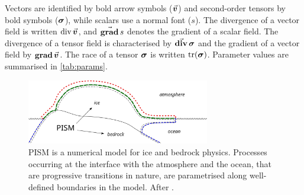 \documentclass[a4paper]{kappa}
\newcommand{\vect}[1]{\va*{#1}} %
\newcommand{\tens}[1]{\vb*{#1}} %
\renewcommand{\div}[1]{\mathrm{div}\,#1}            %
\renewcommand{\grad}[1]{\vect{\mathrm{grad}}\,#1}   %
\newcommand{\tdiv}[1]{\vect{\mathrm{div}}\,#1}      %
\newcommand{\tgrad}[1]{\tens{\mathrm{grad}}\,#1}    %
\newcommand{\CST}[0]{\tens{\sigma}}     %
\newcommand{\vv}[0]{\vect{v}}           %
\begin{document}
Vectors are identified by bold arrow symbols ($\vv$) and second-order tensors by bold symbols ($\CST$), while scalars use a normal font ($s$). The divergence of a vector field is written $\div{\vv}$, and $\grad{s}$ denotes the gradient of a scalar field. The divergence of a tensor field is characterised by $\tdiv{\CST}$ and the gradient of a vector field by $\tgrad{\vv}$. The race of a tensor $\CST$ is written $\tr(\CST)$. Parameter values are summarised in \cref{tab:params}.

\newpage  %

\begin{figure}
  \includegraphics[width=80mm]{model-interfaces}
  \caption{PISM is a numerical model for ice and bedrock physics. Processes
           occurring at the interface with the atmosphere and the ocean, that
           are progressive transitions in nature, are parametrised along
           well-defined boundaries in the model.
           After \citet{PISM-authors.2014}.}
  \label{fig:model-interfaces}
\end{figure}
\end{document}
